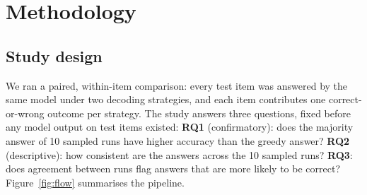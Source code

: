 \section{Methodology}\label{sec:method}

\subsection{Study design}
We ran a paired, within-item comparison: every test item was answered by the same model under two decoding
strategies, and each item contributes one correct-or-wrong outcome per strategy. The study answers three questions,
fixed before any model output on test items existed: \textbf{RQ1} (confirmatory): does the majority answer of 10
sampled runs have higher accuracy than the greedy answer? \textbf{RQ2} (descriptive): how consistent are the
answers across the 10 sampled runs? \textbf{RQ3}: does agreement between runs flag answers that are more likely to
be correct? Figure~\ref{fig:flow} summarises the pipeline.

